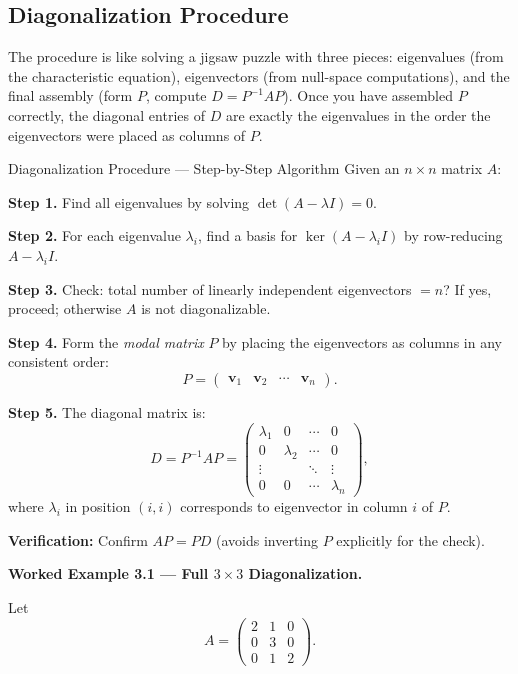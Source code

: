 \documentclass[12pt,a4paper]{article}
\begin{document}

\subsection{Diagonalization Procedure}

The procedure is like solving a jigsaw puzzle with three pieces: eigenvalues (from the characteristic equation), eigenvectors (from null-space computations), and the final assembly (form $P$, compute $D = P^{-1}AP$).
Once you have assembled $P$ correctly, the diagonal entries of $D$ are exactly the eigenvalues in the order the eigenvectors were placed as columns of $P$.

\begin{infobox}{Diagonalization Procedure --- Step-by-Step Algorithm}
Given an $n\times n$ matrix $A$:

\textbf{Step 1.} Find all eigenvalues by solving $\det(A - \lambda I) = 0$.

\textbf{Step 2.} For each eigenvalue $\lambda_i$, find a basis for $\ker(A - \lambda_i I)$ by row-reducing $A - \lambda_i I$.

\textbf{Step 3.} Check: total number of linearly independent eigenvectors $= n$? If yes, proceed; otherwise $A$ is not diagonalizable.

\textbf{Step 4.} Form the \emph{modal matrix} $P$ by placing the eigenvectors as columns in any consistent order:
\[
  P = \begin{pmatrix} \mathbf{v}_1 & \mathbf{v}_2 & \cdots & \mathbf{v}_n \end{pmatrix}.
\]

\textbf{Step 5.} The diagonal matrix is:
\[
  D = P^{-1}AP = \begin{pmatrix} \lambda_1 & 0 & \cdots & 0 \\ 0 & \lambda_2 & \cdots & 0 \\ \vdots & & \ddots & \vdots \\ 0 & 0 & \cdots & \lambda_n \end{pmatrix},
\]
where $\lambda_i$ in position $(i,i)$ corresponds to eigenvector in column $i$ of $P$.

\textbf{Verification:} Confirm $AP = PD$ (avoids inverting $P$ explicitly for the check).
\end{infobox}

\textbf{Worked Example 3.1 --- Full $3\times 3$ Diagonalization.}

Let
\[
  A = \begin{pmatrix} 2 & 1 & 0 \\ 0 & 3 & 0 \\ 0 & 1 & 2 \end{pmatrix}.
\]
\end{document}
